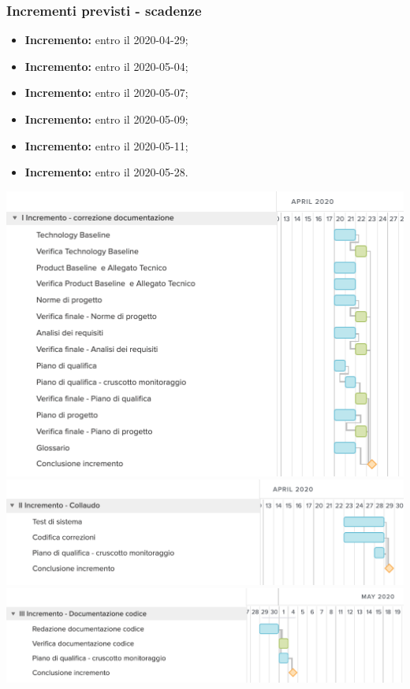 \subsubsection{Incrementi previsti - scadenze}
\begin{itemize}
	\item \textbf{ Incremento:} entro il 2020-04-29;
	\item \textbf{ Incremento:} entro il 2020-05-04;
	\item \textbf{ Incremento:} entro il 2020-05-07;
	\item \textbf{ Incremento:} entro il 2020-05-09;
	\item \textbf{ Incremento:} entro il 2020-05-11;
	\item \textbf{ Incremento:} entro il 2020-05-28.
\end{itemize}
	\includegraphics[width=\textwidth]{res/img/gantt/RA/1}
	\includegraphics[width=\textwidth]{res/img/gantt/RA/2}
	\includegraphics[width=\textwidth]{res/img/gantt/RA/3}
